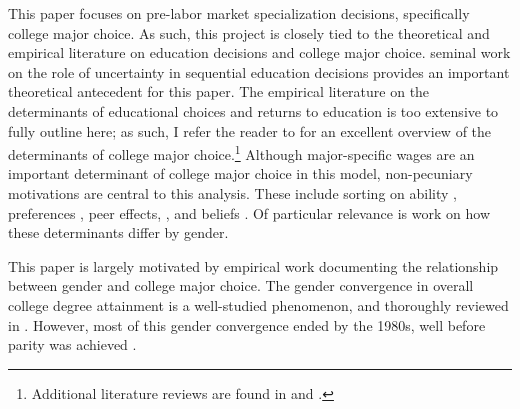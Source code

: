 This paper focuses on pre-labor market specialization decisions, specifically college major choice. 
As such, this project is closely tied to the theoretical and empirical literature on education decisions and college major choice.
 seminal work on the role of uncertainty in sequential education decisions provides an important theoretical antecedent for this paper. 
The empirical literature on the determinants of educational choices and returns to education is too extensive to fully outline here; as such, I refer the reader to \textcite{PWZ20} for an excellent overview of the determinants of college major choice.\footnote{
    Additional literature reviews are found in \textcite{ABM12} and \textcite{AAM16-education}.
}
Although major-specific wages are an important determinant of college major choice in this model, non-pecuniary motivations are central to this analysis.
These include sorting on ability \parencite{A04}, preferences \parencite{Z13}, peer effects, \parencite{PS20}, and beliefs \parencite{AHMR-wp}.
Of particular relevance is work on how these determinants differ by gender. 


This paper is largely motivated by empirical work documenting the relationship between gender and college major choice.
The gender convergence in overall college degree attainment is a well-studied phenomenon, and thoroughly reviewed in \textcite{BK17}.
However, most of this gender convergence ended by the 1980s, well before parity was achieved \parencite{SHB19,EL06}.



